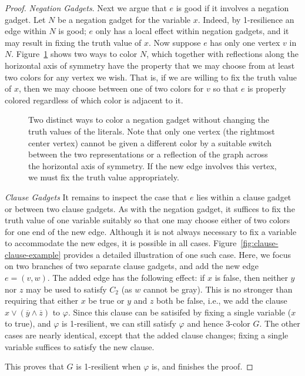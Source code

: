 \documentclass{article}[11pt]  %
\begin{document}
\begin{proof}
\emph{Negation Gadgets}. Next we argue that $e$ is good if it involves a
negation gadget. Let $N$ be a negation gadget for the variable $x$. Indeed, by
1-resilience an edge within $N$ is good; $e$ only has a local effect within
negation gadgets, and it may result in fixing the truth value of $x$. Now
suppose $e$ has only one vertex $v$ in $N$. Figure~\ref{fig:coloring-negation}
shows two ways to color $N$, which together with reflections along the
horizontal axis of symmetry have the property that we may choose from at least
two colors for any vertex we wish. That is, if we are willing to fix the truth
value of $x$, then we may choose between one of two colors for $v$ so that $e$
is properly colored regardless of which color is adjacent to it.  

\begin{figure}
\centering
{}
\caption{Two distinct ways to color a negation gadget without changing the
truth values of the literals. Note that only one vertex (the rightmost center
vertex) cannot be given a different color by a suitable switch between the two
representations or a reflection of the graph across the horizontal axis of
symmetry. If the new edge involves this vertex, we must fix the truth value
appropriately.}
\label{fig:coloring-negation}
\end{figure}

\emph{Clause Gadgets} It remains to inspect the case that $e$ lies within a
clause gadget or between two clause gadgets. As with the negation gadget, it
suffices to fix the truth value of one variable suitably so that one may choose
either of two colors for one end of the new edge. Although it is not always
necessary to fix a variable to accommodate the new edges, it is possible in all
cases.  Figure~\ref{fig:clause-clause-example} provides a detailed illustration
of one such case. Here, we focus on two branches of two separate clause
gadgets, and add the new edge $e = (v,w)$. The added edge has the following
effect: if $x$ is false, then neither $y$ nor $z$ may be used to satisfy $C_2$
(as $w$ cannot be gray). This is no stronger than requiring that either $x$ be
true or $y$ and $z$ both be false, i.e., we add the clause $x \vee
(\overline{y} \wedge \overline{z})$ to $\varphi$. Since this clause can be
satisifed by fixing a single variable ($x$ to true), and $\varphi$ is
1-resilient, we can still satisfy $\varphi$ and hence 3-color $G$. The other
cases are nearly identical, except that the added clause changes; fixing a
single variable suffices to satisfy the new clause.

This proves that $G$ is 1-resilient when $\varphi$ is, and finishes the proof.
\end{proof}
\end{document}

